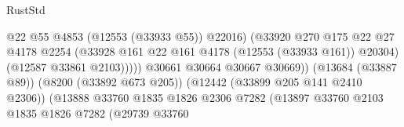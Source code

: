 \begin{lexlean}{RustStd}
\begin{coremodule}
                                                            @22
                                                            @55
                                                            @4853
                                                            (@12553 (@33933 @55))
                                                            @22016)
                                                          (@33920
                                                            @270
                                                            @175
                                                            @22
                                                            @27
                                                            @4178
                                                            @2254
                                                            (@33928
                                                              @161
                                                              @22
                                                              @161
                                                              @4178
                                                              (@12553 (@33933 @161))
                                                              @20304)
                                                            (@12587 @33861 @2103)))))
                                                    @30661
                                                    @30664
                                                    @30667
                                                    @30669))
                                                (@13684 (@33887 @89))
                                                (@8200 (@33892 @673 @205))
                                                (@12442 (@33899 @205 @141 @2410 @2306))
                                                (@13888
                                                  @33760
                                                  @1835
                                                  @1826
                                                  @2306
                                                  @7282
                                                  (@13897
                                                    @33760
                                                    @2103
                                                    @1835
                                                    @1826
                                                    @7282
                                                    (@29739
                                                      @33760

\end{coremodule}
\end{lexlean}
